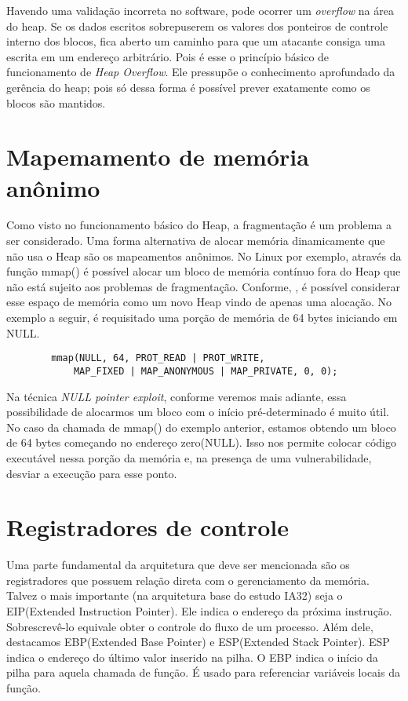 	Havendo uma validação incorreta no software, pode ocorrer um \textsl{overflow} na área do
	heap. Se os dados escritos sobrepuserem os valores dos ponteiros de controle interno dos blocos,
	fica aberto um caminho para que um atacante consiga uma escrita em um endereço arbitrário.
	Pois é esse o princípio básico de funcionamento de \textsl{Heap Overflow}. Ele pressupõe
	o conhecimento aprofundado da gerência do heap; pois só dessa forma é possível prever
	exatamente como os blocos são mantidos.

	\section{Mapemamento de memória anônimo}
	Como visto no funcionamento básico do Heap, a fragmentação é um problema a ser considerado.
	Uma forma alternativa de alocar memória dinamicamente que não usa o Heap são os mapeamentos anônimos.
	No Linux por exemplo, através da função mmap() é possível alocar um bloco de memória contínuo
	fora do Heap que não está sujeito aos problemas de fragmentação.
	Conforme, \cite{Love2007}, é possível considerar esse espaço de memória como um novo Heap
	vindo de apenas uma alocação.
	No exemplo a seguir, é requisitado uma porção de memória de 64 bytes iniciando em NULL.
	\begin{verbatim}
		mmap(NULL, 64, PROT_READ | PROT_WRITE,
			MAP_FIXED | MAP_ANONYMOUS | MAP_PRIVATE, 0, 0);
	\end{verbatim}
	Na técnica \textsl{NULL pointer exploit}, conforme veremos mais adiante, essa possibilidade
	de alocarmos um bloco com o início pré-determinado é muito útil.
	No caso da chamada de mmap() do exemplo anterior, estamos obtendo um bloco de 64 bytes começando
	no endereço zero(NULL). Isso nos permite colocar código executável nessa porção da memória e,
	na presença de uma vulnerabilidade, desviar a execução para esse ponto.
	
	\section{Registradores de controle}
	Uma parte fundamental da arquitetura que deve ser mencionada são os registradores que possuem
	relação direta com o gerenciamento da memória.
	Talvez o mais importante (na arquitetura base do estudo IA32) seja o EIP(Extended Instruction Pointer).
	Ele indica o endereço da próxima instrução. Sobrescrevê-lo equivale obter o controle
	do fluxo de um processo.
	Além dele, destacamos EBP(Extended Base Pointer) e ESP(Extended Stack Pointer).
	ESP indica o endereço do último valor inserido na pilha.
	O EBP indica o início da pilha para aquela chamada de função. É usado para referenciar variáveis
	locais da função.

